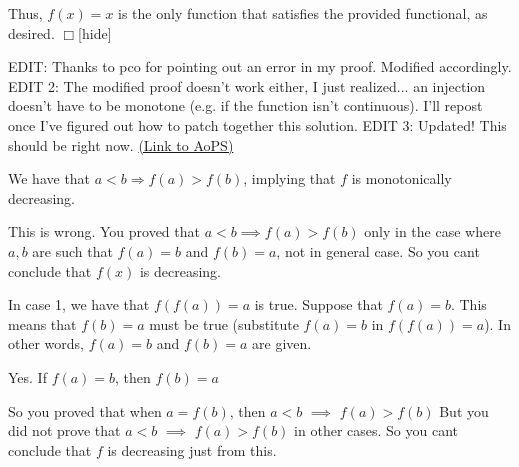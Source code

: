 \begin{problem}
Thus, $f(x) = x$ is the only function that satisfies the provided functional, as desired. $\Box$[\/hide]

EDIT: Thanks to pco for pointing out an error in my proof. Modified accordingly.
EDIT 2: The modified proof doesn't work either, I just realized... an injection doesn't have to be monotone (e.g. if the function isn't continuous). I'll repost once I've figured out how to patch together this solution.
EDIT 3: Updated! This should be right now.
	\flushright \href{https://artofproblemsolving.com/community/c6h487789}{(Link to AoPS)}
\end{problem}



\begin{solution}
	\begin{tcolorbox}We have that $a < b \Rightarrow f(a) > f(b)$, implying that $f$ is monotonically decreasing. \end{tcolorbox}
This is wrong.
You proved that $a<b\implies f(a) > f(b)$ only in the case where $a,b$ are such that $f(a)=b$ and $f(b)=a$, not in general case. So you cant conclude that $f(x)$ is decreasing.
\end{solution}






\begin{solution}
	\begin{tcolorbox}In case 1, we have that $f(f(a)) = a$ is true. Suppose that $f(a) = b$. This means that $f(b) = a$ must be true (substitute $f(a) = b$ in $f(f(a)) = a$). In other words, $f(a) = b$ and $f(b) = a$ are given.\end{tcolorbox}
Yes. If $f(a)=b$, then $f(b)=a$

So you proved that when $a=f(b)$, then $a<b$ $\implies$ $f(a)>f(b)$
But you did not prove that $a<b$ $\implies$ $f(a)>f(b)$ in other cases.
So you cant conclude that $f$ is decreasing just from this.
\end{solution}



